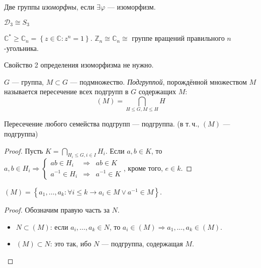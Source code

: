 \begin{define*}
  Две группы \emph{изоморфны}, если $\exists \varphi$ --- изоморфизм.
\end{define*}

\begin{example}
  $\mathcal{D}_3 \cong S_3$
\end{example}

\begin{example}
  $\mathbb{C}^* \ge \mathbb{C}_n = \left\{ z \in \mathbb{C}: z^n = 1 \right\}$. 
  $\mathbb{Z}_n \cong \mathbb{C}_n \cong$ группе вращений правильного $n$-угольника.
\end{example}

\begin{exercise}
  Свойство 2 определения изоморфизма не нужно.
\end{exercise}

\begin{define*}
  $G$ --- группа, $M \subset G$ --- подмножество. \emph{Подгруппой}, порождённой множеством $M$ называется пересечение всех подгрупп в $G$ содержащих $M$:
  $$(M) = \bigcap_{H\le G, M\le H}H$$
\end{define*}

\begin{claim}
  Пересечение любого семейства подгрупп --- подгруппа. (в т.\,ч., $(M)$ --- подгруппа)
\end{claim}

\begin{proof}
  Пусть $K = \bigcap_{H_i \le G, i \in I}H_i$. Если $a, b \in K$, то 
  $a, b \in H_i \Rightarrow 
  \left\{ 
	\begin{aligned}
	  ab \in H_i &\Rightarrow& ab \in K\\ 
	  a^{-1} \in H_i &\Rightarrow& a^{-1} \in K
	\end{aligned}
  \right.$, кроме того, $e \in k$.
\end{proof}

\begin{claim}
  $(M) = \left\{ a_1, \ldots, a_k: \forall i \le k \to a_i \in M \lor a^{-1} \in M \right\}$.
\end{claim}

\begin{proof}
  Обозначим правую часть за $N$.

  \begin{itemize}
	\item $N \subset (M)$: если $a_i, \ldots, a_k \in N$, то $a_i \in (M) \Rightarrow a_1, \ldots, a_k \in (M)$.
	\item $(M) \subset N$: это так, ибо $N$ --- подгруппа, содержащая $M$.
  \end{itemize}
\end{proof}



